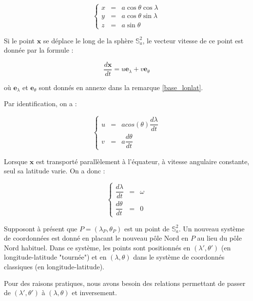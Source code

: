 \begin{equation}
\left\lbrace 
\begin{array}{rcl}
x & = & a \cos \theta \cos \lambda \\
y & = & a \cos \theta \sin \lambda \\
z & = & a \sin \theta
\end{array}
\right.
\end{equation}

Si le point $\mathbf{x}$ se déplace le long de la sphère $\mathbb{S}^2_a$, le vecteur vitesse de ce point est donnée par la formule :

\begin{equation}
\dfrac{d \mathbf{x}}{dt} = u \mathbf{e}_{\lambda} + v \mathbf{e}_{\theta}
\end{equation}

où $\mathbf{e}_{\lambda}$ et $\mathbf{e}_{\theta}$ sont donnés en annexe dans la remarque \ref{base_lonlat}. 

Par identification, on a :

\begin{equation}
\left\lbrace 
\begin{array}{rcl}
u & = & a cos ( \theta ) \dfrac{d \lambda}{dt} \\
v & = & a \dfrac{d \theta}{dt}
\end{array}
\right.
\end{equation}

Lorsque $\mathbf{x}$ est transporté parallèlement à l'équateur, à vitesse angulaire constante, seul sa latitude varie. On a donc :

\begin{equation}
\left\lbrace 
\begin{array}{rcl}
\dfrac{d \lambda}{dt} & = & \omega \\
\dfrac{d \theta}{dt} & = & 0
\end{array}
\right.
\end{equation}

Supposont à présent que $P=( \lambda_P, \theta_P)$ est un point de $\mathbb{S}_a^2$. Un nouveau système de coordonnées est donné en placant le nouveau pôle Nord en $P$ au lieu du pôle Nord habituel. Dans ce système, les points sont positionnés en $(\lambda', \theta')$ (en longitude-latitude "tournée") et en $(\lambda, \theta)$ dans le système de coordonnés classiques (en longitude-latitude).

Pour des raisons pratiques, nous avons besoin des relations permettant de passer de $( \lambda', \theta')$ à $(\lambda, \theta)$ et inversement.

